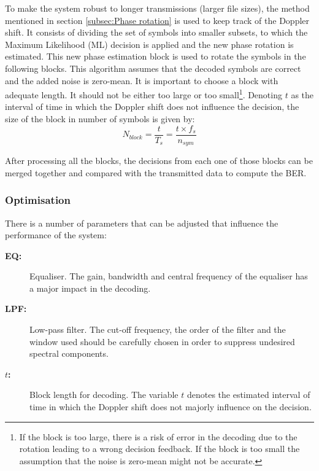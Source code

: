 \documentclass[12pt,a4paper,openright]{report}
\begin{document}
To make the system robust to longer transmissions (larger file sizes), the method mentioned in section \ref{subsec:Phase rotation} is used to keep track of the Doppler shift. It consists of dividing the set of symbols into smaller subsets, to which the Maximum Likelihood (ML) decision is applied and the new phase rotation is estimated. This new phase estimation block is used to rotate the symbols in the following blocks. This algorithm assumes that the decoded symbols are correct and the added noise is zero-mean. It is important to choose a block with adequate length. It should not be either too large or too small\footnote{If the block is too large, there is a risk of error in the decoding due to the rotation leading to a wrong decision feedback. If the block is too small the assumption that the noise is zero-mean might not be accurate.}. Denoting $t$ as the interval of time in which the Doppler shift does not influence the decision, the size of the block in number of symbols is given by:
\begin{equation}
N_{block} = \frac{t}{T_s} = \frac{t\times f_s}{n_{sym}}
\end{equation}

After processing all the blocks, the decisions from each one of those blocks can be merged together and compared with the transmitted data to compute the BER. 

\subsubsection{Optimisation}

There is a number of parameters that can be adjusted that influence the performance of the system:
\begin{description}
\item[\bf EQ:] Equaliser. The gain, bandwidth and central frequency of the equaliser has a major impact in the decoding.
\item[\bf LPF:] Low-pass filter. The cut-off frequency, the order of the filter and the window used should be carefully chosen in order to suppress undesired spectral components. 
\item[\bf $t$:] Block length for decoding. The variable $t$ denotes the estimated interval of time in which the Doppler shift does not majorly influence on the decision. 
\end{description}


\end{document}
